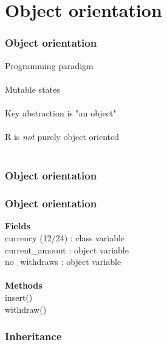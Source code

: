 \documentclass{beamer}
\begin{document}
\section{Object orientation}

\begin{frame}
	\frametitle{Object orientation}
	\begin{center}
		Programming paradigm \\~\\
		
		Mutable states \\~\\
		
		Key abstraction is "an object" \\~\\
		
		R is \textit{not} purely object oriented \\~\\
	\end{center}
\end{frame}

\begin{frame}
	\frametitle{Object orientation}

	\begin{figure}
		\qquad
		\qquad
		\qquad
		\qquad
		\label{fig:1}
	\end{figure}
\end{frame}

\begin{frame}
	\frametitle{Object orientation}
	\textbf{Fields} \\
	currency (12/24) : class variable \\
	current\_amount : object variable \\
	no\_withdraws : object variable \\~\\
	
	\textbf{Methods} \\
	insert() \\
	withdraw()
\end{frame}

\begin{frame}
	\frametitle{Inheritance}
	
	\begin{figure}
		\qquad
		\qquad
		\qquad
		\label{fig:1}
	\end{figure}
\end{frame}
\end{document}

